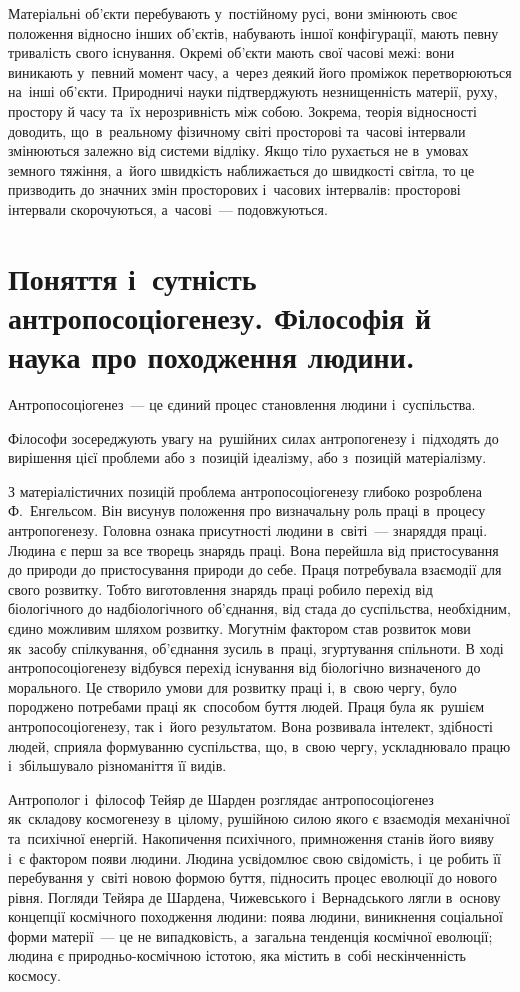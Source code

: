 \documentclass[a5paper,oneside,DIV=12,12pt,headings=small]{scrartcl}
\begin{document}
		Матеріальні об'\-єк\-ти перебувають у~постійному русі, вони змінюють своє положення відносно інших об'\-єк\-тів, набувають іншої конфігурації, мають певну тривалість свого існування. Окремі об'\-єк\-ти мають свої часові межі: вони виникають у~певний момент часу, а~через деякий його проміжок перетворюються на~інші об'\-єк\-ти. Природничі науки підтверджують незнищенність матерії, руху, простору й часу та~їх нерозривність між собою. Зокрема, теорія відносності доводить, що~в~реальному фізичному світі просторові та~часові інтервали змінюються залежно від системи відліку. Якщо тіло рухається не в~умовах земного тяжіння, а~його швидкість наближається до швидкості світла, то це призводить до значних змін просторових і~часових інтервалів: просторові інтервали скорочуються, а~часові~— подовжуються.

	\section{Поняття і~сутність антропосоціогенезу. Філософія й наука про походження людини.}
		Антропосоціогенез~— це єдиний процес становлення людини і~суспільства.
		
		Філософи зосереджують увагу на~рушійних силах антропогенезу і~підходять до вирішення цієї проблеми або з~позицій ідеалізму, або з~позицій матеріалізму.
		
		З матеріалістичних позицій проблема антропосоціогенезу глибоко розроблена Ф. Енгельсом. Він висунув положення про визначальну роль праці в~процесу антропогенезу. Головна ознака присутності людини в~світі~— знаряддя праці. Людина є перш за все творець знарядь праці. Вона перейшла від пристосування до природи до пристосування природи до себе. Праця потребувала взаємодії для свого розвитку. Тобто виготовлення знарядь праці робило перехід від біологічного до надбіологічного об'\-єд\-нан\-ня, від стада до суспільства, необхідним, єдино можливим шляхом розвитку. Могутнім фактором став розвиток мови як~засобу спілкування, об'\-єд\-нан\-ня зусиль в~праці, згуртування спільноти. В ході антропосоціогенезу відбувся перехід існування від біологічно визначеного до морального. Це створило умови для розвитку праці і, в~свою чергу, було породжено потребами праці як~способом буття людей. Праця була як~рушієм антропосоціогенезу, так і~його результатом. Вона розвивала інтелект, здібності людей, сприяла формуванню суспільства, що, в~свою чергу, ускладнювало працю і~збільшувало різноманіття її видів.
		
		Антрополог і~філософ Тейяр де Шарден розглядає антропосоціогенез як~складову космогенезу в~цілому, рушійною силою якого є взаємодія механічної та~психічної енергій. Накопичення психічного, примноження станів його вияву і~є фактором появи людини. Людина усвідомлює свою свідомість, і~це робить її перебування у~світі новою формою буття, підносить процес еволюції до нового рівня. Погляди Тейяра де Шардена, Чижевського і~Вернадського лягли в~основу концепції космічного походження людини: поява людини, виникнення соціальної форми матерії~— це не випадковість, а~загальна тенденція космічної еволюції; людина є природньо-космічною істотою, яка містить в~собі нескінченність космосу.
		
\end{document}
